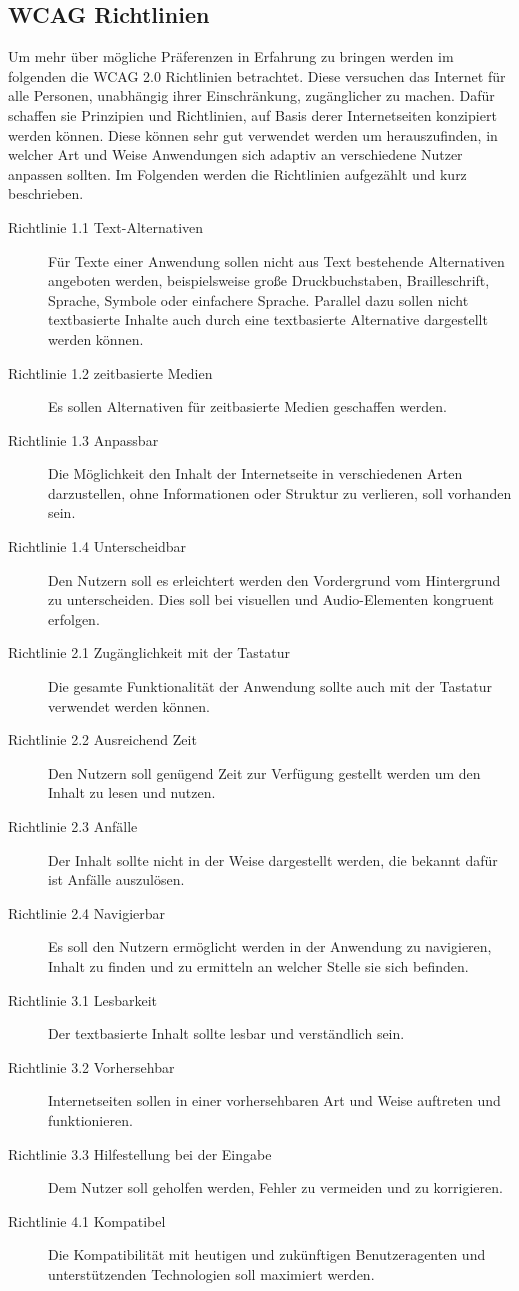 \documentclass[12pt, paper=a4, bibtotoc, toc=listof, headsepline=true]{scrreprt}
\begin{document}
		\subsection{WCAG Richtlinien}
		Um mehr über mögliche Präferenzen in Erfahrung zu bringen werden im folgenden die \ac{WCAG 2.0} Richtlinien betrachtet. Diese versuchen das Internet für alle Personen, unabhängig ihrer Einschränkung, zugänglicher zu machen. Dafür schaffen sie Prinzipien und Richtlinien, auf Basis derer Internetseiten konzipiert werden können. Diese können sehr gut verwendet werden um herauszufinden, in welcher Art und Weise Anwendungen sich adaptiv an verschiedene Nutzer anpassen sollten. Im Folgenden werden die Richtlinien aufgezählt und kurz beschrieben\cite{wcag}.
		\begin{description}
			\item [Richtlinie 1.1 Text-Alternativen] Für Texte einer Anwendung sollen nicht aus Text bestehende Alternativen angeboten werden, beispielsweise große Druckbuchstaben, Brailleschrift, Sprache, Symbole oder einfachere Sprache. Parallel dazu sollen nicht textbasierte Inhalte auch durch eine textbasierte Alternative dargestellt werden können.
			\item[Richtlinie 1.2 zeitbasierte Medien] Es sollen Alternativen für zeitbasierte Medien geschaffen werden.
			\item[Richtlinie 1.3 Anpassbar] Die Möglichkeit den Inhalt der Internetseite in verschiedenen Arten darzustellen, ohne Informationen oder Struktur zu verlieren, soll vorhanden sein.
			\item[Richtlinie 1.4 Unterscheidbar] Den Nutzern soll es erleichtert werden den Vordergrund vom Hintergrund zu unterscheiden. Dies soll bei visuellen und Audio-Elementen kongruent erfolgen. 
			\item[Richtlinie 2.1 Zugänglichkeit mit der Tastatur] Die gesamte Funktionalität der Anwendung sollte auch mit der Tastatur verwendet werden können.	
			\item[Richtlinie 2.2 Ausreichend Zeit] Den Nutzern soll genügend Zeit zur Verfügung gestellt werden um den Inhalt zu lesen und nutzen.
			\item[Richtlinie 2.3 Anfälle] Der Inhalt sollte nicht in der Weise dargestellt werden, die bekannt dafür ist Anfälle auszulösen.
			\item[Richtlinie 2.4 Navigierbar] Es soll den Nutzern ermöglicht werden in der Anwendung zu navigieren, Inhalt zu finden und zu ermitteln an welcher Stelle sie sich befinden.
			\item[Richtlinie 3.1 Lesbarkeit] Der textbasierte Inhalt sollte lesbar und verständlich sein.	
			\item[Richtlinie 3.2 Vorhersehbar] Internetseiten sollen in einer vorhersehbaren Art und Weise auftreten und funktionieren.
			\item[Richtlinie 3.3 Hilfestellung bei der Eingabe] Dem Nutzer soll geholfen werden, Fehler zu vermeiden und zu korrigieren.
			\item[Richtlinie 4.1 Kompatibel] Die Kompatibilität mit heutigen und zukünftigen Benutzeragenten und unterstützenden Technologien soll maximiert werden.
		\end{description}
\end{document}
